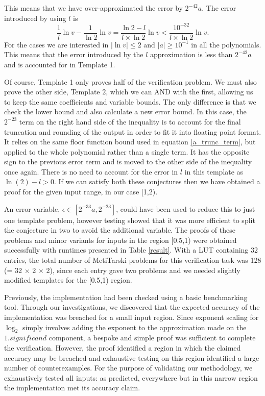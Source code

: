 \documentclass{fac}
\newcommand{\abs}[1]{\lvert#1\rvert}
\begin{document}
This means that we have over-approximated the error by $2^{-42}a$. The error introduced by using $l$ is
\begin{equation*}
    \frac{1}{l}\ln{v} - \frac{1}{\ln{2}}\ln{v} = 
    \frac{\ln{2}-l}{l\times \ln{2}}\ln{v} < \frac{10^{-32}}{l \times \ln{2}} \ln{v}. 
\end{equation*}
For the cases we are interested in $\abs{\ln{v}}\leq 2$ and $|a|\geq 10^{-1}$ in all the polynomials. This means that the error introduced by the $l$ approximation is less than $2^{-42}a$ and is accounted for in Template 1. 

Of course, Template 1 only proves half of the verification problem. We must also prove the other side, Template $2$, which we can AND with the first, allowing us to keep the same coefficients and variable bounds. The only difference is that we check the lower bound and also calculate a new error bound. In this case, the $2^{-23}$ term on the right hand side of the inequality is to account for the final truncation and rounding of the output in order to fit it into floating point format. It relies on the same floor function bound used in equation \ref{a_trunc_term}, but applied to the whole polynomial rather than a single term. It has the opposite sign to the previous error term and is moved to the other side of the inequality once again. There is no need to account for the error in $l$ in this template as $\ln{(2)}-l>0$. If we can satisfy both these conjectures then we have obtained a proof for the given input range, in our case [1,2). 

An error variable, $\epsilon \in [2^{-33}a, 2^{-23}]$, could have been used to reduce this to just one template problem, however testing showed that it was more efficient to split the conjecture in two to avoid the additional variable. The proofs of these problems and minor variants for inputs in the region [0.5,1) were obtained successfully with runtimes presented in Table \ref{result}. With a LUT containing 32 entries, the total number of MetiTarski problems for this verification task was 128 (= 32 $\times$ 2 $\times$ 2), since each entry gave two problems and we needed slightly modified templates for the [0.5,1) region. 

Previously, the implementation had been checked using a basic benchmarking tool. Through our investigations, we discovered that the expected accuracy of the implementation was breached for a small input region. Since exponent scaling for $\log_2$ simply involves adding the exponent to the approximation made on the $1.\textit{significand}$ component, a bespoke and simple proof was sufficient to complete the verification. However, the proof identified a region in which the claimed accuracy may be breached and exhaustive testing on this region identified a large number of counterexamples. For the purpose of validating our methodology, we exhaustively tested all inputs: as predicted, everywhere but in this narrow region the implementation met its accuracy claim.
\end{document}
